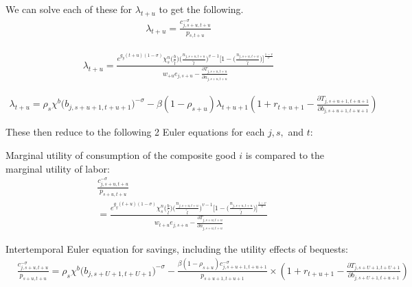     We can solve each of these for $\lambda_{t+u}$ to get the following.
    \begin{equation}
      \begin{split}
      \lambda_{t+u} = \frac{c_{j,s+u,t+u}^{-\sigma}}{ p_{s,t+u}} \nonumber
      \end{split}
    \end{equation}

    \begin{equation}
      \begin{split}
      \lambda_{t+u} = \frac{e^{g_y (t+u)(1-\sigma)}\chi^n_{s}\biggl(\frac{b}{\tilde{l}}\biggr)\biggl(\frac{n_{j,s+u,t+u}}{\tilde{l}}\biggr)^{v-1}\Biggl[1 - \biggl(\frac{n_{j,s+u,t+u}}{\tilde{l}}\biggr)\Biggr]^{\frac{1-v}{v}}}{ w_{+u} e_{j,s+u} - \frac{\partial T_{j,s+u,t+u}}{\partial n_{j,s+u,t+u}} }  \nonumber
      \end{split}
    \end{equation}

    \begin{equation}
      \begin{split}
      \lambda_{t+u} = \rho_s\chi^b\bigl(b_{j,s+u+1,t+u+1}\bigr)^{-\sigma} - \beta (1-\rho_{s+u}) \lambda_{t+u+1} \left( 1 + r_{t+u+1} - \frac{\partial T_{j,s+u+1,t+u+1}}{\partial b_{j,s+u+1,t+u+1}} \right)
        \end{split}  \nonumber
    \end{equation}

    These then reduce to the following 2 Euler equations for each $j,s,$ and $t$:

    Marginal utility of consumption of the composite good $i$ is compared to the marginal utility of labor:
    \begin{equation}\label{EqcEuler}
      \begin{split}
      & \frac{ c_{j,s+u,t+u}^{-\sigma}}{p_{s+u,t+u}} \\
      & = \frac{ e^{g_y (t+u)(1-\sigma)}\chi^n_{s}\biggl(\frac{b}{\tilde{l}}\biggr)\biggl(\frac{n_{j,s+u,t+u}}{\tilde{l}}\biggr)^{v-1}\Biggl[1 - \biggl(\frac{n_{j,s+u,t+u}}{\tilde{l}}\biggr)\Biggr]^{\frac{1-v}{v}} } { w_{t+u} e_{j,s+u} - \frac{\partial T_{j,s+u,t+u}}{\partial n_{j,s+u,t+u}} }
       \end{split}
    \end{equation}

    Intertemporal Euler equation for savings, including the utility effects of bequests:
    \begin{equation}\label{EqbEuler}
      \begin{split}
      & \frac{ c_{j,s+u,t+u}^{-\sigma}}{p_{s+u,t+u}} = \rho_s\chi^b\bigl(b_{j,s+U+1,t+U+1}\bigr)^{-\sigma}  - \frac{ \beta(1-\rho_{s+u}) c_{j,s+u+1,t+u+1}^{-\sigma}} { p_{s+u+1,t+u+1}} \times \left( 1 + r_{t+u+1} - \frac{\partial T_{j,s+U+1,t+U+1}}{\partial b_{j,s+U+1,t+u+1}} \right)
      \end{split}
    \end{equation}

